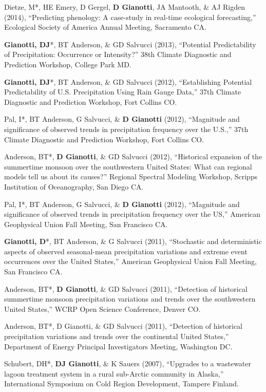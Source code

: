 \documentclass[10pt, a4paper]{article}
\newcommand{\lbr}{\vspace*{12pt}}
\newcommand{\years}[1]{\mbox{}\marginnote{\scriptsize #1}} %
\begin{document}
\years{2014}Dietze, M*, HE Emery, D Gergel, \textbf{D Gianotti}, JA Mantooth, \& AJ Rigden (2014), ``Predicting phenology: A case-study in real-time ecological forecasting,'' Ecological Society of America Annual Meeting, Sacramento CA.\lbr

\years{2013}\textbf{Gianotti, DJ}*, BT Anderson, \& GD Salvucci  (2013), ``Potential Predictability of Precipitation: Occurrence or Intensity?'' 38th Climate Diagnostic and Prediction Workshop, College Park MD.\lbr

\years{2012}\textbf{Gianotti, DJ}*, BT Anderson, \& GD Salvucci (2012), ``Establishing Potential Predictability of U.S. Precipitation Using Rain Gauge Data,'' 37th Climate Diagnostic and Prediction Workshop, Fort Collins CO.\lbr

\years{2012}Pal, I*, BT Anderson, G Salvucci, \& \textbf{D Gianotti}  (2012), ``Magnitude and significance of observed trends in precipitation frequency over the U.S.,'' 37th Climate Diagnostic and Prediction Workshop, Fort Collins CO.\lbr

\years{2012}Anderson, BT*, \textbf{D Gianotti}, \& GD Salvucci (2012), ``Historical expansion of the summertime monsoon over the southwestern United States: What can regional models tell us about its causes?'' Regional Spectral Modeling Workshop, Scripps Institution of Oceanography, San Diego CA.\lbr

\years{2012}Pal, I*, BT Anderson, G Salvucci, \& \textbf{D Gianotti} (2012), ``Magnitude and significance of observed trends in precipitation frequency over the US,'' American Geophysical Union Fall Meeting, San Francisco CA.\lbr

\years{2011}\textbf{Gianotti, D}*, BT Anderson, \& G Salvucci (2011), ``Stochastic and deterministic aspects of observed seasonal-mean precipitation variations and extreme event occurrences over the United States,'' American Geophysical Union Fall Meeting, San Francisco CA.\lbr

\years{2011}Anderson, BT*, \textbf{D Gianotti}, \& GD Salvucci (2011), ``Detection of historical summertime monsoon precipitation variations and trends over the southwestern United States,'' WCRP Open Science Conference, Denver CO.\lbr

\years{2011}Anderson, BT*, D Gianotti, \& GD Salvucci (2011), ``Detection of historical precipitation variations and trends over the continental United States,'' Department of Energy Principal Investigators Meeting, Washington DC.\lbr

\years{2007}Schubert, DH*, \textbf{DJ Gianotti}, \& K Sauers (2007), ``Upgrades to a  wastewater lagoon treatment system in a rural sub-Arctic community in Alaska,'' International Symposium on Cold Region Development, Tampere Finland.\lbr
\end{document}
